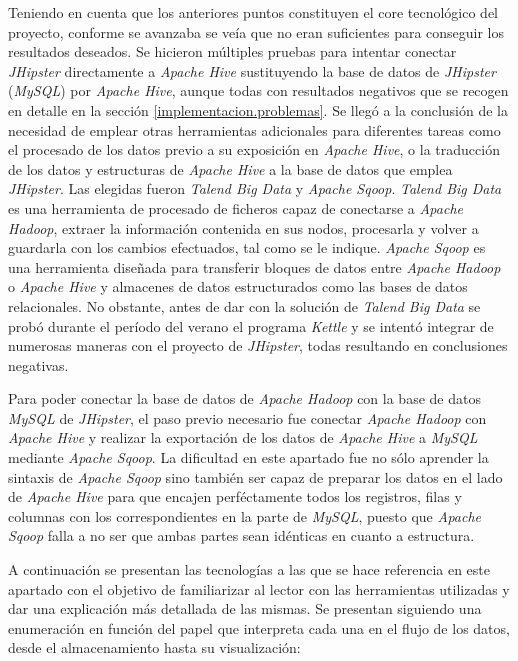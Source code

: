 	\par
	Teniendo en cuenta que los anteriores puntos constituyen el core tecnológico del proyecto, conforme se avanzaba se veía que no eran suficientes para conseguir los resultados deseados. Se hicieron múltiples pruebas para intentar conectar \textit{JHipster} directamente a \textit{Apache Hive} sustituyendo la base de datos de \textit{JHipster} (\textit{MySQL}) por \textit{Apache Hive}, aunque todas con resultados negativos que se recogen en detalle en la sección \ref{implementacion.problemas}. Se llegó a la conclusión de la necesidad de emplear otras herramientas adicionales para diferentes tareas como el procesado de los datos previo a su exposición en \textit{Apache Hive}, o la traducción de los datos y estructuras de \textit{Apache Hive} a la base de datos que emplea \textit{JHipster}. Las elegidas fueron \textit{Talend Big Data} y \textit{Apache Sqoop}. \textit{Talend Big Data} es una herramienta de procesado de ficheros capaz de conectarse a \textit{Apache Hadoop},  extraer la información contenida en sus nodos, procesarla y volver a guardarla con los cambios efectuados, tal como se le indique. \textit{Apache Sqoop} es una herramienta diseñada para transferir bloques de datos entre \textit{Apache Hadoop} o \textit{Apache Hive} y almacenes de datos estructurados como las bases de datos relacionales. No obstante, antes de dar con la solución de \textit{Talend Big Data} se probó durante el período del verano el programa \textit{Kettle} y se intentó integrar de numerosas maneras con el proyecto de \textit{JHipster}, todas resultando en conclusiones negativas.
	\par	
	Para poder conectar la base de datos de \textit{Apache Hadoop} con la base de datos \textit{MySQL} de \textit{JHipster}, el paso previo necesario fue conectar \textit{Apache Hadoop} con \textit{Apache Hive} y realizar la exportación de los datos de \textit{Apache Hive} a \textit{MySQL} mediante \textit{Apache Sqoop}. La dificultad en este apartado fue no sólo aprender la sintaxis de \textit{Apache Sqoop} sino también ser capaz de preparar los datos en el lado de \textit{Apache Hive} para que encajen perféctamente todos los registros, filas y columnas con los correspondientes en la parte de \textit{MySQL}, puesto que \textit{Apache Sqoop} falla a no ser que ambas partes sean idénticas en cuanto a estructura. \par
	A continuación se presentan las tecnologías a las que se hace referencia en este apartado con el objetivo de familiarizar al lector con las herramientas utilizadas y dar una explicación más detallada de las mismas. Se presentan siguiendo una enumeración en función del papel que interpreta cada una en el flujo de los datos, desde el almacenamiento hasta su visualización: 
